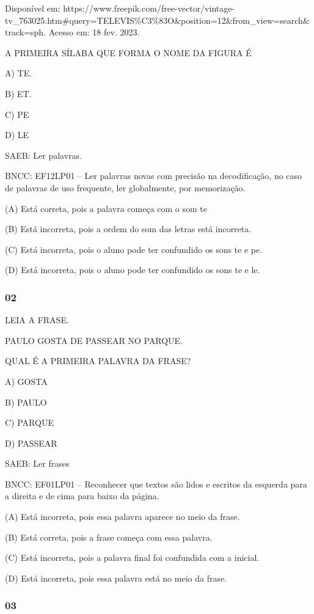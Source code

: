 Disponível
em: https://www.freepik.com/free-vector/vintage-tv\_763025.htm\#query=TELEVIS\%C3\%83O\&position=12\&from\_view=search\&track=sph.
Acesso em: 18 fev. 2023.

A PRIMEIRA SÍLABA QUE FORMA O NOME DA FIGURA É

A) TE.

B) ET.

C) PE

D) LE

SAEB: Ler palavras.

BNCC: EF12LP01 -- Ler palavras novas com precisão na decodificação, no caso
de palavras de uso frequente, ler globalmente, por memorização.

(A) Está correta, pois a palavra começa com o som te

(B) Está incorreta, pois a ordem do som das letras está incorreta.

\protect\hypertarget{_heading=h.3rdcrjn}{}{}(C) Está incorreta, pois o aluno
pode ter confundido os sons te e pe.

(D) Está incorreta, pois o aluno pode ter confundido os sons te e le.

\subsubsection{02 }\label{section-5}

LEIA A FRASE.

PAULO GOSTA DE PASSEAR NO PARQUE.

QUAL É A PRIMEIRA PALAVRA DA FRASE?

A) GOSTA

B) PAULO

C) PARQUE

D) PASSEAR

SAEB: Ler frases

BNCC: EF01LP01 -- Reconhecer que textos são lidos e escritos da esquerda
para a direita e de cima para baixo da página.

(A) Está incorreta, pois essa palavra aparece no meio da frase.

(B) Está correta, pois a frase começa com essa palavra.

(C) Está incorreta, pois a palavra final foi confundida com a inicial.

(D) Está incorreta, pois essa palavra está no meio da frase.

\subsubsection{03 }\label{section-6}

